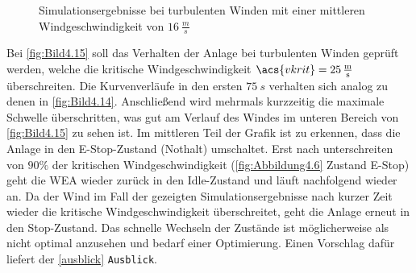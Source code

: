 \begin{figure}[H]
   \centering
   \caption[Simulationsergebnisse bei moderaten turbulenten Winden]{Simulationsergebnisse bei turbulenten Winden mit einer mittleren Windgeschwindigkeit von $\SI{16}{\frac{m}{s}}$}
   \label{fig:Bild4.14}
\end{figure}

Bei \autoref{fig:Bild4.15} soll das Verhalten der Anlage bei turbulenten Winden geprüft werden, welche die kritische Windgeschwindigkeit $\acs{vkrit} = \SI{25}{\frac{m}{s}}$ überschreiten. Die Kurvenverläufe in den ersten $\SI{75}{s}$ verhalten sich analog zu denen in \autoref{fig:Bild4.14}. Anschließend wird mehrmals kurzzeitig die maximale Schwelle überschritten, was gut am Verlauf des Windes im unteren Bereich von \autoref{fig:Bild4.15} zu sehen ist. Im mittleren Teil der Grafik ist zu erkennen, dass die Anlage in den E-Stop-Zustand (Nothalt) umschaltet. Erst nach unterschreiten von $90\%$ der kritischen Windgeschwindigkeit (\vgl \autoref{fig:Abbildung4.6} Zustand E-Stop) geht die WEA wieder zurück in den Idle-Zustand und läuft nachfolgend wieder an. Da der Wind im Fall der gezeigten Simulationsergebnisse nach kurzer Zeit wieder die kritische Windgeschwindigkeit überschreitet, geht die Anlage erneut in den Stop-Zustand. Das schnelle Wechseln der Zustände ist möglicherweise als nicht optimal anzusehen und bedarf einer Optimierung. Einen Vorschlag dafür liefert der \autoref{ausblick} \texttt{Ausblick}.  

